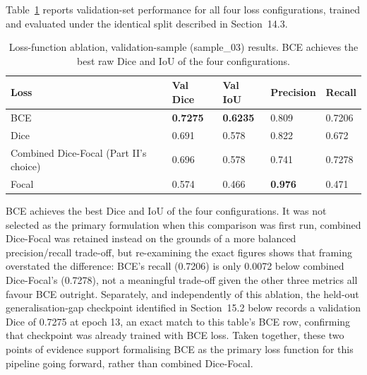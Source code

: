 
Table~\ref{tab:loss_ablation} reports validation-set performance for all four loss configurations,
trained and evaluated under the identical split described in Section~14.3.

\begin{table}[htbp]
\centering
\caption{Loss-function ablation, validation-sample (sample\_03) results. BCE achieves the best raw
  Dice and IoU of the four configurations.}
\label{tab:loss_ablation}
\begin{tabular}{lllll}
\toprule
\textbf{Loss} & \textbf{Val Dice} & \textbf{Val IoU} & \textbf{Precision} & \textbf{Recall} \\
\midrule
BCE                    & \textbf{0.7275} & \textbf{0.6235} & 0.809 & 0.7206 \\
Dice                   & 0.691           & 0.578           & 0.822 & 0.672 \\
Combined Dice-Focal (Part II's choice) & 0.696 & 0.578      & 0.741 & 0.7278 \\
Focal                  & 0.574           & 0.466           & \textbf{0.976} & 0.471 \\
\bottomrule
\end{tabular}
\end{table}

BCE achieves the best Dice and IoU of the four configurations. It was not selected as the primary
formulation when this comparison was first run, combined Dice-Focal was retained instead on the
grounds of a more balanced precision/recall trade-off, but re-examining the exact figures shows that
framing overstated the difference: BCE's recall (0.7206) is only 0.0072 below combined Dice-Focal's
(0.7278), not a meaningful trade-off given the other three metrics all favour BCE outright. Separately,
and independently of this ablation, the held-out generalisation-gap checkpoint identified in
Section~15.2 below records a validation Dice of 0.7275 at epoch 13, an exact match to this table's BCE
row, confirming that checkpoint was already trained with BCE loss. Taken together, these two points of
evidence support formalising BCE as the primary loss function for this pipeline going forward, rather
than combined Dice-Focal.

